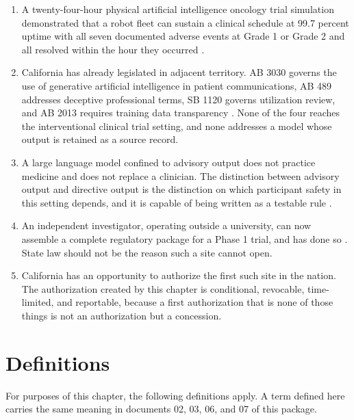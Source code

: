 \begin{enumerate}
\item A twenty-four-hour physical artificial intelligence oncology trial
  simulation demonstrated that a robot fleet can sustain a clinical schedule at
  99.7 percent uptime with all seven documented adverse events at Grade 1 or
  Grade 2 and all resolved within the hour they occurred \cite{newtrial2026}.

\item California has already legislated in adjacent territory. AB 3030 governs
  the use of generative artificial intelligence in patient communications,
  AB 489 addresses deceptive professional terms, SB 1120 governs utilization
  review, and AB 2013 requires training data transparency
  \cite{ab3030_2024,ab489_2025,sb1120_2024,ab2013_2024}. None of the four
  reaches the interventional clinical trial setting, and none addresses a model
  whose output is retained as a source record.

\item A large language model confined to advisory output does not practice
  medicine and does not replace a clinician. The distinction between advisory
  output and directive output is the distinction on which participant safety in
  this setting depends, and it is capable of being written as a testable rule
  \cite{cliniciantrust}.

\item An independent investigator, operating outside a university, can now
  assemble a complete regulatory package for a Phase 1 trial, and has done so
  \cite{phase1protocol,indapp}. State law should not be the reason such a site
  cannot open.

\item California has an opportunity to authorize the first such site in the
  nation. The authorization created by this chapter is conditional, revocable,
  time-limited, and reportable, because a first authorization that is none of
  those things is not an authorization but a concession.
\end{enumerate}

\section{Definitions}

For purposes of this chapter, the following definitions apply. A term defined
here carries the same meaning in documents 02, 03, 06, and 07 of this package.

